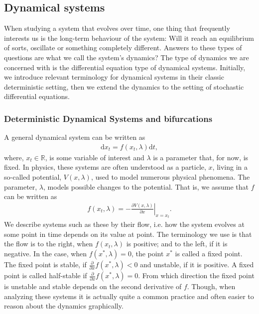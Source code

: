 \subsection{Dynamical systems}
When studying a system that evolves over time, one thing that frequently interests us is the long-term behaviour of the system: Will it reach an equilibrium of sorts, oscillate or something completely different. Answers to these types of questions are what we call the system's dynamics? The type of dynamics we are concerned with is the differential equation type of dynamical systems. Initially, we introduce relevant terminology for dynamical systems in their classic deterministic setting, then we extend the dynamics to the setting of stochastic differential equations. 
\subsubsection{Deterministic Dynamical Systems and bifurcations}
A general dynamical system can be written as
\begin{align}
    \mathrm{d}x_t = f(x_t, \lambda)\mathrm{d}t, \label{eq:generalDynamicalSystem}
\end{align}
where, $x_t\in\mathbb{R}$, is some variable of interest and $\lambda$ is a parameter that, for now, is fixed. In physics, these systems are often understood as a particle, $x$, living in a so-called potential, $V(x,\lambda)$, used to model numerous physical phenomena. The parameter, $\lambda$, models possible changes to the potential. That is, we assume that $f$ can be written as
\begin{align}
     f(x_t, \lambda) = \left.-\frac{\partial V(x,\lambda)}{\partial x}\right|_{x=x_t}.
\end{align}
We describe systems such as these by their flow, i.e. how the system evolves at some point in time depends on its value at point. The terminology we use is that the flow is to the right, when $f(x_t, \lambda)$ is positive; and to the left, if it is negative. In the case, when $f(x^*, \lambda) = 0$, the point $x^*$ is called a fixed point. The fixed point is stable, if $\frac{\partial}{\partial x}f(x^*, \lambda) < 0$ and unstable, if it is positive. A fixed point is called half-stable if $\frac{\partial}{\partial x}f(x^*, \lambda) = 0$. From which direction the fixed point is unstable and stable depends on the second derivative of $f$. Though, when analyzing these systems it is actually quite a common practice and often easier to reason about the dynamics graphically.\\\\

